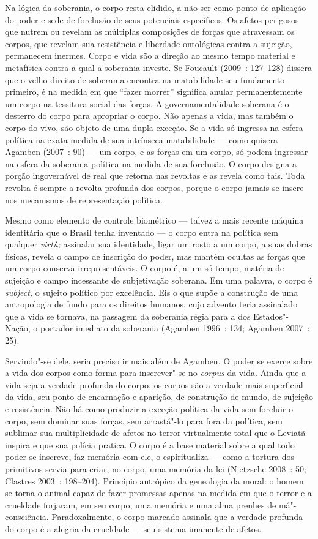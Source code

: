 Na lógica da soberania, o corpo resta elidido, a não ser como ponto de
aplicação do poder e sede de forclusão de seus potenciais específicos.
Os afetos perigosos que nutrem ou revelam as múltiplas composições de
forças que atravessam os corpos, que revelam sua resistência e liberdade
ontológicas contra a sujeição, permanecem inermes. Corpo e vida são a
direção ao mesmo tempo material e metafísica contra a qual a soberania
investe. Se Foucault (2009~: 127--128) dissera que o velho direito de
soberania encontra na matabilidade seu fundamento primeiro, é na medida
em que ``fazer morrer'' significa anular permanentemente um corpo na
tessitura social das forças. A governamentalidade soberana é o desterro
do corpo para apropriar o corpo. Não apenas a vida, mas também o corpo
do vivo, são objeto de uma dupla exceção. Se a vida só ingressa na
esfera política na exata medida de sua intrínseca matabilidade --- como
quisera Agamben (2007~: 90) --- um corpo, e as forças em um corpo, só
podem ingressar na esfera da soberania política na medida de sua
forclusão. O corpo designa a porção ingovernável de real que retorna nas
revoltas e as revela como tais. Toda revolta é sempre a revolta profunda
dos corpos, porque o corpo jamais se insere nos mecanismos de
representação política.

Mesmo como elemento de controle biométrico --- talvez a mais recente
máquina identitária que o Brasil tenha inventado --- o corpo entra na
política sem qualquer \emph{virtù; }assinalar sua identidade, ligar um
rosto a um corpo, a suas dobras físicas, revela o campo de inscrição do
poder, mas mantém ocultas as forças que um corpo conserva
irrepresentáveis. O corpo é, a um só tempo, matéria de sujeição e campo
incessante de subjetivação soberana. Em uma palavra, o corpo é
\emph{subject,} o sujeito político por excelência. Eis o que supõe a
construção de uma antropologia de fundo para os direitos humanos, cujo
advento teria assinalado que a vida se tornava, na passagem da soberania
régia para a dos Estados"-Nação, o portador imediato da soberania
(Agamben 1996~: 134; Agamben 2007~: 25).

Servindo"-se dele, seria preciso ir mais além de Agamben. O poder se
exerce sobre a vida dos corpos como forma para inscrever"-se no
\emph{corpus }da vida. Ainda que a vida seja a verdade profunda do
corpo, os corpos são a verdade mais superficial da vida, seu ponto de
encarnação e aparição, de construção de mundo, de sujeição e
resistência. Não há como produzir a exceção política da vida sem
forcluir o corpo, sem dominar suas forças, sem arrastá"-lo para fora da
política, sem sublimar sua multiplicidade de afetos no terror
virtualmente total que o Leviatã inspira e que sua polícia pratica. O
corpo é a base material sobre a qual todo poder se inscreve, faz memória
com ele, o espiritualiza --- como a tortura dos primitivos servia para
criar, no corpo, uma memória da lei (Nietzsche 2008~: 50; Clastres 2003~:
198--204). Princípio antrópico da genealogia da moral: o homem se torna
o animal capaz de fazer promessas apenas na medida em que o terror e a
crueldade forjaram, em seu corpo, uma memória e uma alma prenhes de
má"-consciência. Paradoxalmente, o corpo marcado assinala que a verdade
profunda do corpo é a alegria da crueldade --- seu sistema imanente de
afetos.

